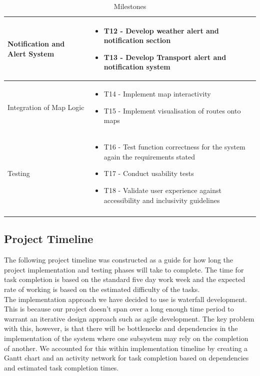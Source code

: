 \documentclass{article}
\begin{document}
\begin{longtable}{|p{4cm}|p{13cm}|}
Notification and Alert System
& 
\vspace{-\topsep}
\begin{itemize}[itemsep=2pt, topsep=0pt, parsep=0pt]
    \item T12 - Develop weather alert and notification section
    \item T13 - Develop Transport alert and notification system
\end{itemize} \\
\hline

Integration of Map Logic
& 
\vspace{-\topsep}
\begin{itemize}[itemsep=2pt, topsep=0pt, parsep=0pt]
    \item T14 - Implement map interactivity
    \item T15 - Implement visualisation of routes onto maps
\end{itemize} \\
\hline

Testing
&
\vspace{-\topsep}
\begin{itemize}[itemsep=2pt, topsep=1pt, parsep=0pt]
    \item T16 - Test function correctness for the system again the requirements stated
    \item T17 - Conduct usability tests
    \item T18 - Validate user experience against accessibility and inclusivity guidelines
\end{itemize} \\
\hline

\caption{Milestones}
\end{longtable}



\subsection{Project Timeline}

The following project timeline was constructed as a guide for how long the project implementation and testing phases will take to complete. The time for task completion is based on the standard five day work week and the expected rate of working is based on the estimated difficulty of the tasks.  \\

The implementation approach we have decided to use is waterfall development. This is because our project doesn't span over a long enough time period to warrant an iterative design approach such as agile development. The key problem with this, however, is that there will be bottlenecks and dependencies in the implementation of the system where one subsystem may rely on the completion of another. We accounted for this within implementation timeline by creating a Gantt chart and an activity network for task completion based on dependencies and estimated task completion times. \\
\end{document}
